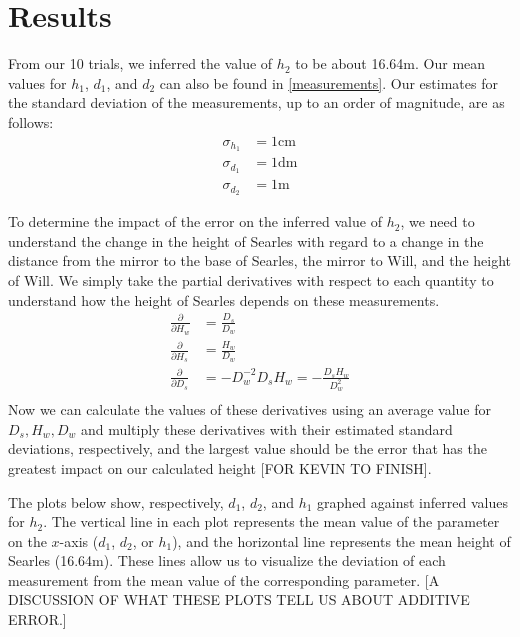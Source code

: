 \documentclass[11pt]{article}
\begin{document}
\section{Results}
From our 10 trials, we inferred the value of $h_2$ to be about 16.64m. Our mean values for $h_1$, $d_1$, and $d_2$ can also be found in \ref{measurements}. Our estimates for the standard deviation of the measurements, up to an order of magnitude, are as follows:
\begin{align*}
\sigma_{h_1} &= 1\text{cm} \\
\sigma_{d_1} &= 1\text{dm} \\
\sigma_{d_2} &= 1\text{m}
\end{align*}

To determine the impact of the error on the inferred value of $h_2$, we need to understand the change in the height of Searles with regard to a change in the distance from the mirror to the base of Searles, the mirror to Will, and the height of Will. We simply take the partial derivatives with respect to each quantity to understand how the height of Searles depends on these measurements. \\
\begin{align*}
    \frac{\partial}{\partial H_w} &= \frac{D_s}{D_w} \\
	\frac{\partial}{\partial H_s} &= \frac{H_w}{D_w} \\
	\frac{\partial}{\partial D_s} &= -D_w^{-2}D_sH_w = -\frac{D_sH_w}{D_w^2} \\
\end{align*}
Now we can calculate the values of these derivatives using an average value for $D_s, H_w, D_w$ and multiply these derivatives with their estimated standard deviations, respectively, and the largest value should be the error that has the greatest impact on our calculated height [FOR KEVIN TO FINISH].

The plots below show, respectively, $d_1$, $d_2$, and $h_1$ graphed against inferred values for $h_2$. The vertical line in each plot represents the mean value of the parameter on the $x$-axis ($d_1$, $d_2$, or $h_1$), and the horizontal line represents the mean height of Searles (16.64m). These lines allow us to visualize the deviation of each measurement from the mean value of the corresponding parameter. [A DISCUSSION OF WHAT THESE PLOTS TELL US ABOUT ADDITIVE ERROR.]
\end{document}
